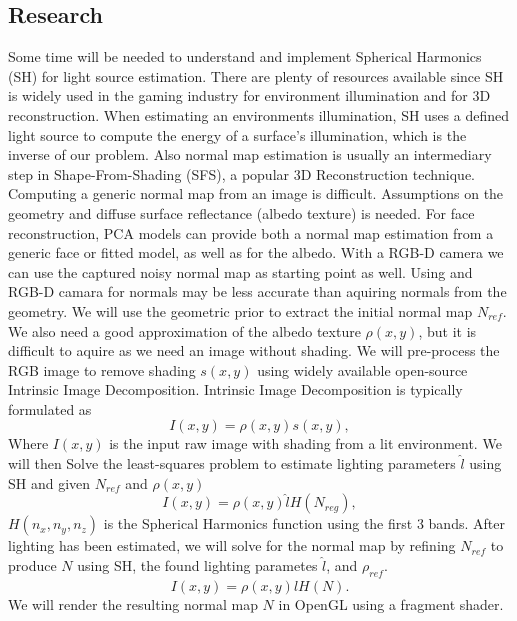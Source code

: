 \documentclass[10pt,twocolumn,letterpaper]{article}
\begin{document}
\subsection{Research}
Some time will be needed to understand and implement Spherical Harmonics (SH) for light source estimation. There are plenty of resources available since SH is widely used in the gaming industry for environment illumination and for 3D reconstruction. When estimating an environments illumination, SH uses a defined light source to compute the energy of a surface's illumination, which is the inverse of our problem. Also normal map estimation is usually an intermediary step in Shape-From-Shading (SFS), a popular 3D Reconstruction technique. Computing a generic normal map from an image is difficult. Assumptions on the geometry and diffuse surface reflectance (albedo texture) is needed. For face reconstruction, PCA models can provide both a normal map estimation from a generic face or fitted model, as well as for the albedo. With a RGB-D camera we can use the captured noisy normal map as starting point as well. Using and RGB-D camara for normals may be less accurate than aquiring normals from the geometry. We will use the geometric prior to extract the initial normal map $N_{ref}$. We also need a good approximation of the albedo texture $\rho(x,y)$, but it is difficult to aquire as we need an image without shading. We will pre-process the RGB image to remove shading $s(x,y)$ using widely available open-source Intrinsic Image Decomposition. Intrinsic Image Decomposition is typically formulated as 
\begin{equation}
I(x,y) = \rho(x,y)s(x,y),
\end{equation}
Where $I(x,y)$ is the input raw image with shading from a lit environment. We will then Solve the least-squares problem to estimate lighting parameters $\hat{l}$ using SH and given $N_{ref}$ and $\rho(x,y)$ 
\begin{equation}
I(x,y) = \rho(x,y)\hat{l}H(N_{reg}),
\end{equation}
$H(n_x,n_y,n_z)$ is the Spherical Harmonics function using the first 3 bands. After lighting has been estimated, we will solve for the normal map by refining $N_{ref}$ to produce $N$ using SH, the found lighting parametes $\hat{l}$, and $\rho_{ref}$.
\begin{equation}
I(x,y) = \rho(x,y)\hat{l}H(N).
\end{equation}
We will render the resulting normal map $N$ in OpenGL using a fragment shader.
\end{document}
